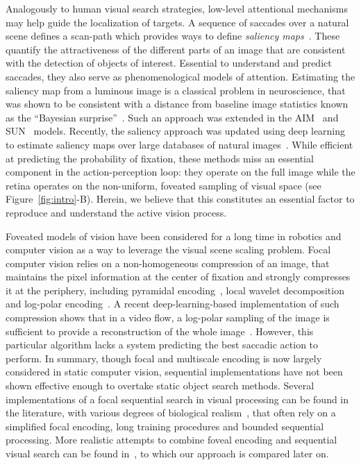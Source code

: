 Analogously to human visual search strategies, low-level attentional mechanisms may help guide the localization of targets. A sequence of saccades over a natural scene defines a scan-path which provides ways to define \emph{saliency maps}~\cite{Itti01}. These quantify the attractiveness of the different parts of an image that are consistent with the detection of objects of interest. Essential to understand and predict saccades, they also serve as phenomenological models of attention. Estimating the saliency map from a luminous image is a classical problem in neuroscience, that was shown to be consistent with a distance from baseline image statistics known as the ``Bayesian surprise''~\cite{Itti2009}. Such an approach was extended in the AIM~\cite{Bruce2009} and SUN~\cite{Zhang2008} models. Recently, the saliency approach was updated using deep learning to estimate saliency maps over large databases of natural images~\cite{Kummerer17}. While efficient at predicting the probability of fixation, these methods miss an essential component in the action-perception loop: they operate on the full image while the retina operates on the non-uniform, foveated sampling of visual space (see Figure~\ref{fig:intro}-B). Herein, we believe that this constitutes an essential factor to reproduce and understand the active vision process.

Foveated models of vision have been considered for a long time in robotics and computer vision as a way to leverage the visual scene scaling problem. Focal computer vision relies on a non-homogeneous compression of an image, that maintains the pixel information at the center of fixation and strongly compresses it at the periphery, including pyramidal encoding~\cite{kortum1996implementation,Butko2010infomax}, local wavelet decomposition~\cite{dauce2018active} and log-polar encoding~\cite{Traver10}. A recent deep-learning-based implementation of such compression shows that in a video flow, a log-polar sampling of the image is sufficient to provide a reconstruction of the whole image~\cite{Kaplanyan19}. However, this particular algorithm lacks a system predicting the best saccadic action to perform. In summary, though focal and multiscale encoding is now largely considered in static computer vision, sequential implementations have not been shown effective enough to overtake static object search methods. Several implementations of a focal sequential search in visual processing can be found in the literature, with various degrees of biological realism~\cite{mnih2014recurrent,fu2017look}, that often rely on a simplified focal encoding, long training procedures and bounded sequential processing. More realistic attempts to combine foveal encoding and sequential visual search can be found in~\cite{Butko2010infomax,denil2012learning,dauce2018active}, to which our approach is compared later on.

